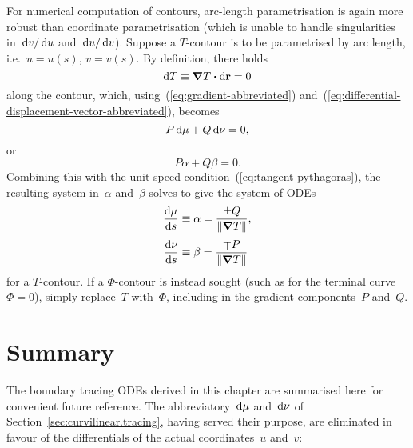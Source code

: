 For numerical computation of contours,
arc-length parametrisation is again more robust
than coordinate parametrisation
(which is unable to handle singularities
in~$\mathop{}\!\mathrm{d} v / \mathop{}\!\mathrm{d} u$ and~$\mathop{}\!\mathrm{d} u / \mathop{}\!\mathrm{d} v$).
Suppose a $T$-contour is to be parametrised by arc length,
i.e.~$u = u (s)$, $v = v(s)$.
By definition, there holds
\[
  \mathop{}\!\mathrm{d} T \equiv \mathop{}\!\boldsymbol{\mathrm{\nabla}} T \boldsymbol{\cdot} \mathop{}\!\mathrm{d} \boldsymbol{\mathrm{r}} = 0
\]
along the contour,
which, using~(\ref{eq:gradient-abbreviated})
and~(\ref{eq:differential-displacement-vector-abbreviated}),
becomes
\[
  P \mathop{}\!\mathrm{d} \mu + Q \mathop{}\!\mathrm{d} \nu = 0,
\]
or
\begin{equation}
  P \alpha + Q \beta = 0.
  \label{eq:contour-arc-length-parametrisation-contour}
\end{equation}
Combining this with the unit-speed condition~(\ref{eq:tangent-pythagoras}),
the resulting system in~$\alpha$ and~$\beta$
solves to give the system of ODEs
\begin{align}
  \tder{\mu}{s} &\defeq \alpha = \frac{\pm Q}{\norm{\del T}},
    \label{eq:contour-ode-arc-length-parametrisation-mu} \\[\fraclinespace]
  \tder{\nu}{s} &\defeq \beta = \frac{\mp P}{\norm{\del T}}
    \label{eq:contour-ode-arc-length-parametrisation-nu}
\end{align}
for a $T$-contour.
If a $\Phi$-contour is instead sought
(such as for the terminal curve~$\Phi = 0$),
simply replace~$T$ with~$\Phi$,
including in the gradient components~$P$ and~$Q$.

\section{Summary}
\label{sec:curvilinear.summary}

The boundary tracing ODEs derived in this chapter
are summarised here for convenient future reference.
The abbreviatory~$\mathop{}\!\mathrm{d} \mu$ and~$\mathop{}\!\mathrm{d} \nu$
of Section~\ref{sec:curvilinear.tracing},
having served their purpose,
are eliminated in favour of the differentials
of the actual coordinates~$u$ and~$v$:
